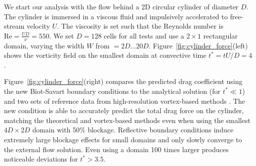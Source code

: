 \documentclass[11pt]{article}
\begin{document}
We start our analysis with the flow behind a 2D circular cylinder of diameter $D$. The cylinder is immersed in a viscous fluid and impulsively accelerated to free-stream velocity $U$. The viscosity is set such that the Reynolds number is $\text{Re}=\frac{UD}{\nu}=550$. We set $D=128$ cells for all tests and use a $2\times 1$ rectangular domain, varying the width $W$ from $=2D\ldots 20D$. Figure~\ref{fig:cylinder_force}(left) shows the vorticity field on the smallest domain at convective time $t^*=tU/D=4$.

Figure~\ref{fig:cylinder_force}(right) compares the predicted drag coefficient using the new Biot-Savart boundary conditions to the analytical solution \cite{Collins1973TheCylinder} (for $t^*\ll 1$) and two sets of reference data from high-resolution vortex-based methods \cite{Koumoutsakos1995High-resolutionMethods,Gillis2019AMethod}. The new condition is able to accurately predict the total drag force on the cylinder, matching the theoretical and vortex-based methods even when using the smallest $4D\times2D$ domain with 50\% blockage. 
Reflective boundary conditions induce extremely large blockage effects for small domains and only slowly converge to the external flow solution. Even using a domain 100 times larger produces noticeable deviations for $t^*>3.5$. %

\end{document}
